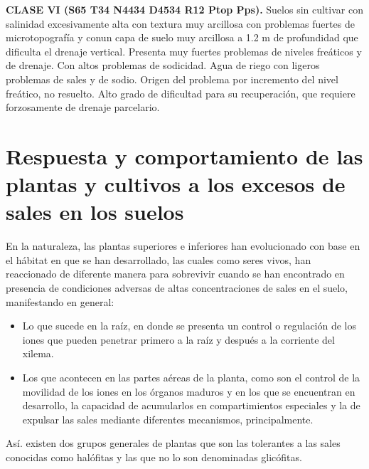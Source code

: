 \begin{example}
    \textbf{CLASE VI (S65 T34 N4434 D4534 R12 Ptop Pps).} Suelos sin cultivar con salinidad excesivamente alta con textura muy arcillosa con problemas fuertes de microtopografía y conun capa de suelo muy arcillosa a 1.2 m de profundidad que dificulta el drenaje vertical. Presenta muy fuertes problemas de niveles freáticos y de drenaje. Con altos problemas de sodicidad. Agua de riego con ligeros problemas de sales y de sodio. Origen del problema por incremento del nivel freático, no resuelto. Alto grado de dificultad para su recuperación, que requiere forzosamente de drenaje parcelario.
\end{example}




\section{Respuesta y comportamiento de las plantas y cultivos a los excesos de sales en los suelos}
En la naturaleza, las plantas superiores e inferiores han evolucionado con base en el hábitat en que se han desarrollado, las cuales como seres vivos, han reaccionado de diferente manera para sobrevivir cuando se han encontrado en presencia de condiciones adversas de altas concentraciones de sales en el suelo, manifestando en general:
\begin{itemize}
    \item Lo que sucede en la raíz, en donde se presenta un control o regulación de los iones que pueden penetrar primero a la raíz y después a la corriente del xilema. 
    \item Los que acontecen en las partes aéreas de la planta, como son el control de la movilidad de los iones en los órganos maduros y en los que se encuentran en desarrollo, la capacidad de acumularlos en compartimientos especiales y la de expulsar las sales mediante diferentes mecanismos, principalmente.
\end{itemize}
Así. existen dos grupos generales de plantas que son las tolerantes a las sales conocidas como halófitas y las que no lo son denominadas glicófitas. 

